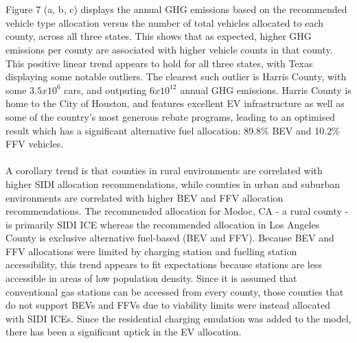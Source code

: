 \documentclass[answers]{exam}
\begin{document}
\\~\\
Figure 7 (a, b, c) displays the annual GHG emissions based on the recommended vehicle type allocation versus the number of total vehicles allocated to each county, across all three states. This shows that as expected, higher GHG emissions per county are associated with higher vehicle counts in that county. This positive linear trend appears to hold for all three states, with Texas displaying some notable outliers. The clearest such outlier is Harris County, with some $3.5x10^6$ cars, and outputing $6x10^12$ annual GHG emissions. Harris County is home to the City of Houston, and features excellent EV infrastructure as well as some of the country's most generous rebate programs, leading to an optimised result which has a significant alternative fuel allocation: 89.8\% BEV and 10.2\% FFV vehicles.
\\ ~\\
A corollary trend is that counties in rural environments are correlated with higher SIDI allocation recommendations, while counties in urban and suburban environments are correlated with higher BEV and FFV allocation recommendations. The recommended allocation for Modoc, CA - a rural county - is primarily SIDI ICE whereas the recommended allocation in Los Angeles County is exclusive alternative fuel-based (BEV and FFV). Because BEV and FFV allocations were limited by charging station and fuelling station accessibility, this trend appears to fit expectations because stations are less accessible in areas of low population density. Since it is assumed that conventional gas stations can be accessed from every county, those counties that do not support BEVs and FFVs due to viability limits were instead allocated with SIDI ICEs. Since the residential charging emulation was added to the model, there has been a significant uptick in the EV allocation. 
\end{document}
